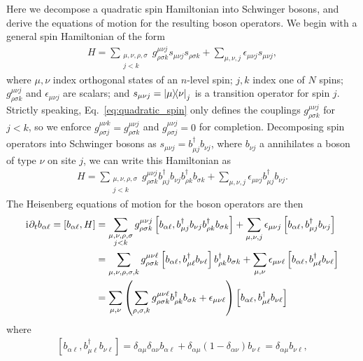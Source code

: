 \documentclass[nofootinbib,twocolumn]{revtex4-2}
\newcommand{\p}[1]{\left(#1\right)} %
\renewcommand{\sp}[1]{\left[#1\right]} %
\renewcommand{\i}{\mathrm{i}\mkern1mu} %
\newcommand{\1}{\mathds{1}}
\begin{document}
Here we decompose a quadratic spin Hamiltonian into Schwinger bosons, and derive the equations of motion for the resulting boson operators.
We begin with a general spin Hamiltonian of the form
\begin{align}
  H = \sum_{\substack{\mu,\nu,\rho,\sigma\\j<k}}
  g^{\mu\nu j}_{\rho\sigma k} s_{\mu\nu j} s_{\rho\sigma k}
  + \sum_{\mu,\nu,j} \epsilon_{\mu\nu j} s_{\mu\nu j},
  \label{eq:quadratic_spin}
\end{align}
where $\mu,\nu$ index orthogonal states of an $n$-level spin; $j,k$ index one of $N$ spins; $g^{\mu\nu j}_{\rho\sigma k}$ and $\epsilon_{\mu\nu j}$ are scalars; and $s_{\mu\nu j}=\op{\mu}{\nu}_j$ is a transition operator for spin $j$.
Strictly speaking, Eq.~\eqref{eq:quadratic_spin} only defines the couplings $g^{\mu\nu j}_{\rho\sigma k}$ for $j<k$, so we enforce $g^{\mu\nu k}_{\rho\sigma j}=g^{\mu\nu j}_{\rho\sigma k}$ and $g^{\mu\nu j}_{\rho\sigma j}=0$ for completion.
Decomposing spin operators into Schwinger bosons as $s_{\mu\nu j}=b_{\mu j}^\dag b_{\nu j}$, where $b_{\nu j}$ a annihilates a boson of type $\nu$ on site $j$, we can write this Hamiltonian as
\begin{align}
  H = \sum_{\substack{\mu,\nu,\rho,\sigma\\j<k}}
  g^{\mu\nu j}_{\rho\sigma k}
  b_{\mu j}^\dag b_{\nu j} b_{\rho k}^\dag b_{\sigma k}
  + \sum_{\mu,\nu,j} \epsilon_{\mu\nu j} b_{\mu j}^\dag b_{\nu j}.
\end{align}
The Heisenberg equations of motion for the boson operators are then
\begin{align}
  \i \partial_t b_{\alpha\ell} = \sp{b_{\alpha\ell}, H}
  &= \sum_{\substack{\mu,\nu,\rho,\sigma\\j<k}}
  g^{\mu\nu j}_{\rho\sigma k}
  \sp{b_{\alpha\ell}, b_{\mu j}^\dag b_{\nu j} b_{\rho k}^\dag b_{\sigma k}}
  + \sum_{\mu,\nu,j} \epsilon_{\mu\nu j}
  \sp{b_{\alpha\ell}, b_{\mu j}^\dag b_{\nu j}} \\
  &= \sum_{\mu,\nu,\rho,\sigma,k} g^{\mu\nu\ell}_{\rho\sigma k}
  \sp{b_{\alpha\ell}, b_{\mu\ell}^\dag b_{\nu\ell}}
  b_{\rho k}^\dag b_{\sigma k}
  + \sum_{\mu,\nu} \epsilon_{\mu\nu\ell}
  \sp{b_{\alpha\ell}, b_{\mu\ell}^\dag b_{\nu\ell}} \\
  &= \sum_{\mu,\nu} \p{\sum_{\rho,\sigma,k}
    g^{\mu\nu\ell}_{\rho\sigma k} b_{\rho k}^\dag b_{\sigma k}
    + \epsilon_{\mu\nu\ell}}
  \sp{b_{\alpha\ell}, b_{\mu\ell}^\dag b_{\nu\ell}}
\end{align}
where
\begin{align}
  \sp{b_{\alpha\ell}, b_{\mu\ell}^\dag b_{\nu\ell}}
  = \delta_{\alpha\mu} \delta_{\alpha\nu} b_{\alpha\ell}
  + \delta_{\alpha\mu} \p{1-\delta_{\alpha\nu}} b_{\nu\ell}
  = \delta_{\alpha\mu} b_{\nu\ell},
\end{align}
\end{document}
